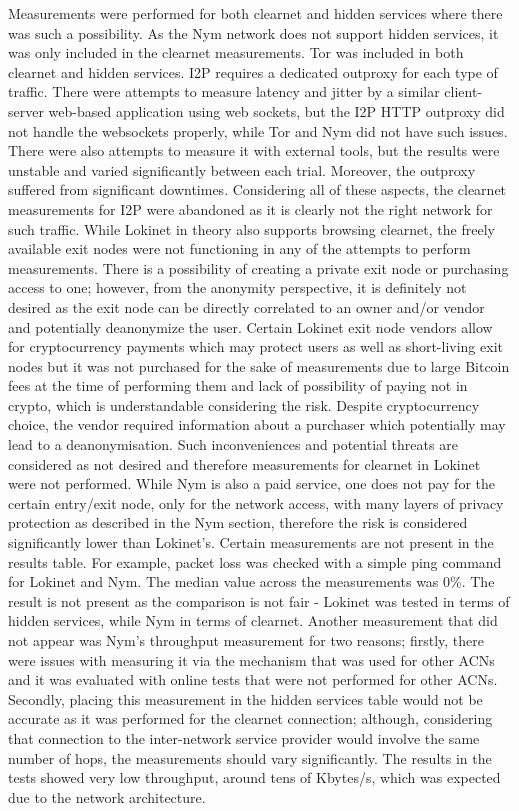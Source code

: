 Measurements were performed for both clearnet and hidden services where there was such a possibility. As the Nym network does not support hidden services, it was only included in the clearnet measurements. Tor was included in both clearnet and hidden services. I2P requires a dedicated outproxy for each type of traffic. There were attempts to measure latency and jitter by a similar client-server web-based application using web sockets, but the I2P HTTP outproxy did not handle the websockets properly, while Tor and Nym did not have such issues. There were also attempts to measure it with external tools, but the results were unstable and varied significantly between each trial. Moreover, the outproxy suffered from significant downtimes. Considering all of these aspects, the clearnet measurements for I2P were abandoned as it is clearly not the right network for such traffic. While Lokinet in theory also supports browsing clearnet, the freely available exit nodes were not functioning in any of the attempts to perform measurements. There is a possibility of creating a private exit node or purchasing access to one; however, from the anonymity perspective, it is definitely not desired as the exit node can be directly correlated to an owner and/or vendor and potentially deanonymize the user. Certain Lokinet exit node vendors allow for cryptocurrency payments which may protect users as well as short-living exit nodes but it was not purchased for the sake of measurements due to large Bitcoin fees at the time of performing them and lack of possibility of paying not in crypto, which is understandable considering the risk. Despite cryptocurrency choice, the vendor required information about a purchaser which potentially may lead to a deanonymisation. Such inconveniences and potential threats are considered as not desired and therefore measurements for clearnet in Lokinet were not performed. 
While Nym is also a paid service, one does not pay for the certain entry/exit node, only for the network access, with many layers of privacy protection as described in the Nym section, therefore the risk is considered significantly lower than Lokinet’s.
Certain measurements are not present in the results table. For example, packet loss was checked with a simple ping command for Lokinet and Nym. The median value across the measurements was 0\%. The result is not present as the comparison is not fair - Lokinet was tested in terms of hidden services, while Nym in terms of clearnet.
Another measurement that did not appear was Nym's throughput measurement for two reasons; firstly, there were issues with measuring it via the mechanism that was used for other ACNs and it was evaluated with online tests that were not performed for other ACNs. Secondly, placing this measurement in the hidden services table would not be accurate as it was performed for the clearnet connection; although, considering that connection to the inter-network service provider would involve the same number of hops, the measurements should vary significantly. The results in the tests showed very low throughput, around tens of Kbytes/s, which was expected due to the network architecture. 

